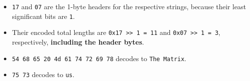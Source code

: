 \documentclass[10pt,a4paper]{article}
\begin{document}
\begin{enumerate}
          \begin{itemize}
              \item \texttt{17} and \texttt{07} are the
                    1-byte headers for the respective strings, because their
                    least significant bits are \texttt{1}.
              \item Their encoded total lengths are
                    \texttt{0x17 >> 1 = 11} and
                    \texttt{0x07 >> 1 = 3}, respectively,
                    \textbf{including the header bytes}.
              \item \texttt{54 68 65 20 4d 61 74 72 69 78} decodes to
                    \texttt{The Matrix}.
              \item \texttt{75 73} decodes to \texttt{us}.
          \end{itemize}
\end{enumerate}

\printendnotes
\end{document}
